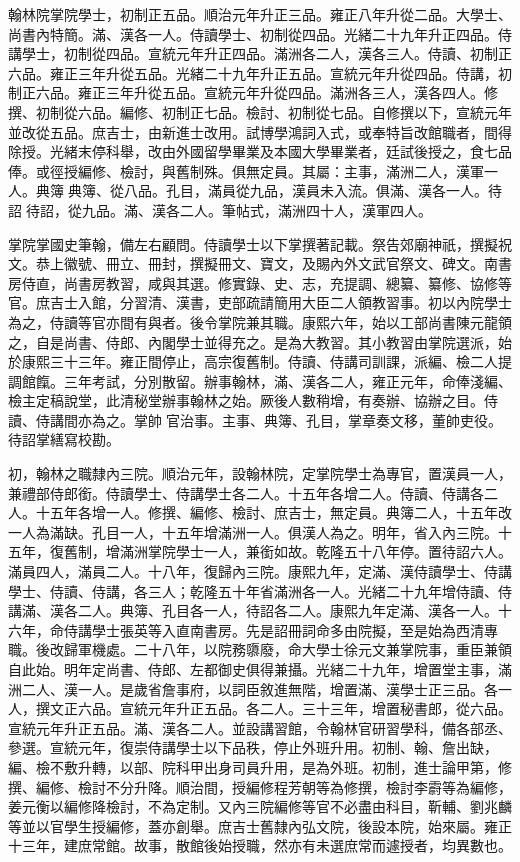 \begin{pinyinscope}
翰林院掌院學士，初制正五品。順治元年升正三品。雍正八年升從二品。大學士、尚書內特簡。滿、漢各一人。侍讀學士、初制從四品。光緒二十九年升正四品。侍講學士，初制從四品。宣統元年升正四品。滿洲各二人，漢各三人。侍讀、初制正六品。雍正三年升從五品。光緒二十九年升正五品。宣統元年升從四品。侍講，初制正六品。雍正三年升從五品。宣統元年升從四品。滿洲各三人，漢各四人。修撰、初制從六品。編修、初制正七品。檢討、初制從七品。自修撰以下，宣統元年並改從五品。庶吉士，由新進士改用。試博學鴻詞入式，或奉特旨改館職者，間得除授。光緒末停科舉，改由外國留學畢業及本國大學畢業者，廷試後授之，食七品俸。或徑授編修、檢討，與舊制殊。俱無定員。其屬：主事，滿洲二人，漢軍一人。典簿典簿、從八品。孔目，滿員從九品，漢員未入流。俱滿、漢各一人。待詔待詔，從九品。滿、漢各二人。筆帖式，滿洲四十人，漢軍四人。

掌院掌國史筆翰，備左右顧問。侍讀學士以下掌撰著記載。祭告郊廟神祇，撰擬祝文。恭上徽號、冊立、冊封，撰擬冊文、寶文，及賜內外文武官祭文、碑文。南書房侍直，尚書房教習，咸與其選。修實錄、史、志，充提調、總纂、纂修、協修等官。庶吉士入館，分習清、漢書，吏部疏請簡用大臣二人領教習事。初以內院學士為之，侍讀等官亦間有與者。後令掌院兼其職。康熙六年，始以工部尚書陳元龍領之，自是尚書、侍郎、內閣學士並得充之。是為大教習。其小教習由掌院選派，始於康熙三十三年。雍正間停止，高宗復舊制。侍讀、侍講司訓課，派編、檢二人提調館餼。三年考試，分別散留。辦事翰林，滿、漢各二人，雍正元年，命俸淺編、檢主定稿說堂，此清秘堂辦事翰林之始。厥後人數稍增，有奏辦、協辦之目。侍讀、侍講間亦為之。掌帥官治事。主事、典簿、孔目，掌章奏文移，董帥吏役。待詔掌繕寫校勘。

初，翰林之職隸內三院。順治元年，設翰林院，定掌院學士為專官，置漢員一人，兼禮部侍郎銜。侍讀學士、侍講學士各二人。十五年各增二人。侍讀、侍講各二人。十五年各增一人。修撰、編修、檢討、庶吉士，無定員。典簿二人，十五年改一人為滿缺。孔目一人，十五年增滿洲一人。俱漢人為之。明年，省入內三院。十五年，復舊制，增滿洲掌院學士一人，兼銜如故。乾隆五十八年停。置待詔六人。滿員四人，滿員二人。十八年，復歸內三院。康熙九年，定滿、漢侍讀學士、侍講學士、侍讀、侍講，各三人；乾隆五十年省滿洲各一人。光緒二十九年增侍讀、侍講滿、漢各二人。典簿、孔目各一人，待詔各二人。康熙九年定滿、漢各一人。十六年，命侍講學士張英等入直南書房。先是詔冊詞命多由院擬，至是始為西清專職。後改歸軍機處。二十八年，以院務隳廢，命大學士徐元文兼掌院事，重臣兼領自此始。明年定尚書、侍郎、左都御史俱得兼攝。光緒二十九年，增置堂主事，滿洲二人、漢一人。是歲省詹事府，以詞臣敘進無階，增置滿、漢學士正三品。各一人，撰文正六品。宣統元年升正五品。各二人。三十三年，增置秘書郎，從六品。宣統元年升正五品。滿、漢各二人。並設講習館，令翰林官研習學科，備各部丞、參選。宣統元年，復崇侍講學士以下品秩，停止外班升用。初制、翰、詹出缺，編、檢不敷升轉，以部、院科甲出身司員升用，是為外班。初制，進士論甲第，修撰、編修、檢討不分升降。順治間，授編修程芳朝等為修撰，檢討李霨等為編修，姜元衡以編修降檢討，不為定制。又內三院編修等官不必盡由科目，靳輔、劉兆麟等並以官學生授編修，蓋亦創舉。庶吉士舊隸內弘文院，後設本院，始來屬。雍正十三年，建庶常館。故事，散館後始授職，然亦有未選庶常而遽授者，均異數也。


\end{pinyinscope}
